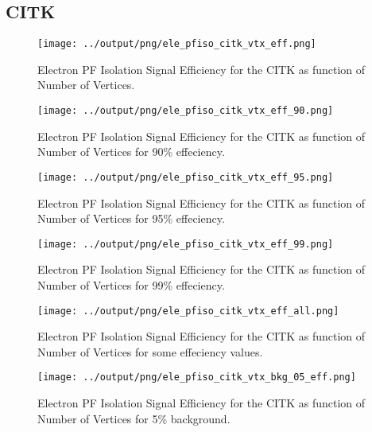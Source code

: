 \documentclass[11pt]{book}
\begin{document}
\subsection{CITK}
\begin{figure}[htb]
\centering
\texttt{[image: ../output/png/ele\_pfiso\_citk\_vtx\_eff.png]}
\caption{Electron PF Isolation Signal Efficiency for the CITK as function of Number of Vertices.}
\label{fig:ele_pfiso_vtx_eff_citk}
\end{figure}

\begin{figure}[htb]
\centering
\texttt{[image: ../output/png/ele\_pfiso\_citk\_vtx\_eff\_90.png]}
\caption{Electron PF Isolation Signal Efficiency for the CITK as function of Number of Vertices for 90\% effeciency.}
\label{fig:ele_pfiso_vtx_eff_citk_eff_90}
\end{figure}

\begin{figure}[htb]
\centering
\texttt{[image: ../output/png/ele\_pfiso\_citk\_vtx\_eff\_95.png]}
\caption{Electron PF Isolation Signal Efficiency for the CITK as function of Number of Vertices for 95\% effeciency.}
\label{fig:ele_pfiso_vtx_eff_citk_eff_95}
\end{figure}

\begin{figure}[htb]
\centering
\texttt{[image: ../output/png/ele\_pfiso\_citk\_vtx\_eff\_99.png]}
\caption{Electron PF Isolation Signal Efficiency for the CITK as function of Number of Vertices for 99\% effeciency.}
\label{fig:ele_pfiso_vtx_eff_citk_eff_99}
\end{figure}

\begin{figure}[htb]
\centering
\texttt{[image: ../output/png/ele\_pfiso\_citk\_vtx\_eff\_all.png]}
\caption{Electron PF Isolation Signal Efficiency for the CITK as function of Number of Vertices for some effeciency values.}
\label{fig:ele_pfiso_vtx_eff_citk_eff_all}
\end{figure}

\begin{figure}[htb]
\centering
\texttt{[image: ../output/png/ele\_pfiso\_citk\_vtx\_bkg\_05\_eff.png]}
\caption{Electron PF Isolation Signal Efficiency for the CITK as function of Number of Vertices for 5\% background.}
\label{fig:ele_pfiso_vtx_eff_citk_bkg_05_eff}
\end{figure}
\end{document}
